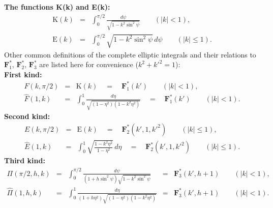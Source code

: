 \documentclass[]{article}
\begin{document}
\textbf{The functions K(k) and E(k):}
\begin{eqnarray*}
\mathrm{K}(k) & = & \displaystyle \int_0^{\pi/2}
\frac{d\psi}{\sqrt{1-k^2\sin^2 \psi}} \qquad (|k| < 1), \\
\mathrm{E}(k) & = & \displaystyle \int_0^{\pi/2}
\sqrt{1-k^2\sin^2 \psi} \, d\psi \qquad (|k| \le 1).
\end{eqnarray*}
\newpage
Other common definitions of the complete elliptic integrals and their
relations to $\mathbf{F}_1^*$, $\mathbf{F}_2^*$, $\mathbf{F}_3^*$ are
listed here for convenience ($k^2+{k'}^2 = 1$): \\[2mm]
\textbf{First kind:}
$$ \begin{array}{rcl}
F(k,\pi/2) & = & \mathrm{K}(k) \quad = \quad \mathbf{F}_1^*(k') \qquad
(|k| < 1), \\[6mm]
\widehat{F}(1,k) & = & \displaystyle \int_0^1
\frac{d\eta}{\sqrt{(1-\eta^2)(1-k^2\eta^2)}} \quad = \quad
\mathbf{F}_1^*(k') \qquad (|k| < 1).
\end{array} $$
\textbf{Second kind:}
$$ \begin{array}{rcl}
E(k,\pi/2) & = & \mathrm{E}(k) \quad = \quad \mathbf{F}_2^*(k',1,{k'}^2)
\qquad (|k| \le 1), \\[6mm]
\widehat{E}(1,k) & = & \displaystyle \int_0^1
\sqrt{\frac{1-k^2 \eta^2}{1-\eta^2}} \, d\eta \quad = \quad
\mathbf{F}_2^*(k',1,{k'}^2) \qquad (|k| \le 1).
\end{array} $$
\textbf{Third kind:}
$$ \begin{array}{rclcl}
\Pi(\pi/2,h,k) & = & \displaystyle \int_0^{\pi/2}
\frac{d\psi}{(1+h\sin^2 \psi)\sqrt{1-k^2\sin^2 \psi}} & = &
\mathbf{F}_3^*(k',h+1) \qquad (|k| < 1), \\[6mm]
\widehat{\Pi}(1,h,k) & = & \displaystyle \int_0^1
\frac{d\eta}{(1+h\eta^2)\sqrt{(1-\eta^2)(1-k^2\eta^2)}} & = &
\mathbf{F}_3^*(k',h+1) \qquad (|k| < 1).
\end{array} $$
\end{document}
